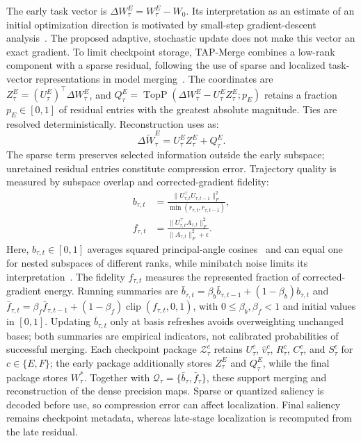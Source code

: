 \documentclass[fleqn,10pt]{wlscirep}
\begin{document}
The early task vector is $\Delta W_{\tau}^{E}=W_{\tau}^{E}-W_0$. Its interpretation as an estimate of an initial optimization direction is motivated by small-step gradient-descent analysis~\cite{taskvectorsgradients2026}. The proposed adaptive, stochastic update does not make this vector an exact gradient. To limit checkpoint storage, TAP-Merge combines a low-rank component with a sparse residual, following the use of sparse and localized task-vector representations in model merging~\cite{modelbreadcrumbs2024,tallmasks2024,dare2024}. The coordinates are $Z_{\tau}^{E}=(U_{\tau}^{E})^{\top}\Delta W_{\tau}^{E}$, and $Q_{\tau}^{E}=\operatorname{TopP} (\Delta W_{\tau}^{E}-U_{\tau}^{E}Z_{\tau}^{E};p_E)$ retains a fraction $p_E\in[0,1]$ of residual entries with the greatest absolute magnitude. Ties are resolved deterministically. Reconstruction uses as:
\begin{equation}
\Delta\widetilde W_{\tau}^{E}
=U_{\tau}^{E}Z_{\tau}^{E}+Q_{\tau}^{E}.
\label{eq:early_reconstruction}
\end{equation}
The sparse term preserves selected information outside the early subspace; unretained residual entries constitute compression error. Trajectory quality is measured by subspace overlap and corrected-gradient fidelity:
\begin{equation}
\begin{aligned}
b_{\tau,t}
&=\frac{\|U_{\tau,t}^{\top}U_{\tau,t-1}\|_F^2}
{\min(r_{\tau,t},r_{\tau,t-1})},\\
f_{\tau,t}
&=\frac{\|U_{\tau,t}^{\top}A_{\tau,t}\|_F^2}
{\|A_{\tau,t}\|_F^2+\epsilon}.
\end{aligned}
\label{eq:adaptive_rank_stability}
\end{equation}
Here, $b_{\tau,t}\in[0,1]$ averages squared principal-angle cosines~\cite{welore2025,isotropicmerging2025} and can equal one for nested subspaces of different ranks, while minibatch noise limits its interpretation~\cite{nosubspace2026}. The fidelity $f_{\tau,t}$ measures the represented fraction of corrected-gradient energy. Running summaries are $\bar b_{\tau,t}=\beta_b\bar b_{\tau,t-1}+(1-\beta_b)b_{\tau,t}$ and $\bar f_{\tau,t}=\beta_f\bar f_{\tau,t-1}+(1-\beta_f)\operatorname{clip}(f_{\tau,t},0,1)$, with $0\leq\beta_b,\beta_f<1$ and initial values in $[0,1]$. Updating $\bar b_{\tau,t}$ only at basis refreshes avoids overweighting unchanged bases; both summaries are empirical indicators, not calibrated probabilities of successful merging. Each checkpoint package $\mathcal{Z}_{\tau}^{c}$ retains $U_{\tau}^{c}$, $\widehat v_{\tau}^{c}$, $R_{\tau}^{c}$, $C_{\tau}^{c}$, and $S_{\tau}^{c}$ for $c\in\{E,F\}$; the early package additionally stores $Z_{\tau}^{E}$ and $Q_{\tau}^{E}$, while the final package stores $W_{\tau}^{*}$. Together with $\mathcal{Q}_{\tau}=\{\bar b_{\tau},\bar f_{\tau}\}$, these support merging and reconstruction of the dense precision maps. Sparse or quantized saliency is decoded before use, so compression error can affect localization. Final saliency remains checkpoint metadata, whereas late-stage localization is recomputed from the late residual.
\end{document}
